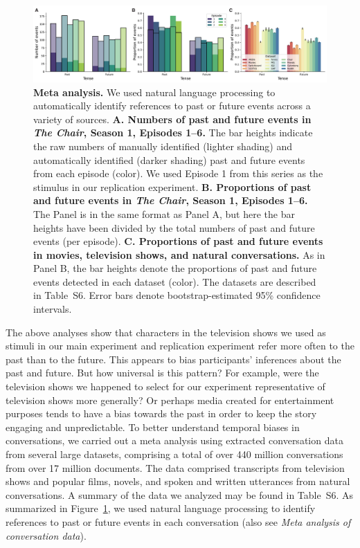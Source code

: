 \documentclass[10pt]{article}
\newcommand{\metaAnalysisDatasets}{S6}
\begin{document}
\begin{figure}[tp]
  \centering
  \includegraphics[width=\textwidth]{meta-analysis}

\caption{\textbf{Meta analysis.} We used natural language processing to
automatically identify references to past or future events across a variety of
sources. \textbf{A. Numbers of past and future events in \textit{The Chair},
Season 1, Episodes 1--6.} The bar heights indicate the raw numbers of manually
identified (lighter shading) and automatically identified (darker shading) past
and future events from each episode (color). We used Episode 1 from this series
as the stimulus in our replication experiment. \textbf{B. Proportions of past
and future events in \textit{The Chair}, Season 1, Episodes 1--6.} The Panel is
in the same format as Panel A, but here the bar heights have been divided by
the total numbers of past and future events (per episode). \textbf{C.
Proportions of past and future events in movies, television shows, and natural
conversations.} As in Panel B, the bar heights denote the proportions of past
and future events detected in each dataset (color). The datasets are described
in Table~\metaAnalysisDatasets. Error bars denote bootstrap-estimated 95\% confidence
intervals.}
  
  \label{fig:meta-analysis}
\end{figure}

The above analyses show that characters in the television shows we used as
stimuli in our main experiment and replication experiment refer more often to
the past than to the future. This appears to bias participants' inferences
about the past and future. But how universal is this pattern? For example, were
the television shows we happened to select for our experiment representative of
television shows more generally? Or perhaps media created for entertainment
purposes tends to have a bias towards the past in order to keep the story
engaging and unpredictable. To better understand temporal biases in
conversations, we carried out a meta analysis using extracted conversation data
from several large datasets, comprising a total of over 440 million
conversations from over 17 million documents. The data comprised transcripts
from television shows and popular films, novels, and spoken and written
utterances from natural conversations. A summary of the data we analyzed may be
found in Table~\metaAnalysisDatasets. As summarized in Figure~\ref{fig:meta-analysis}, we
used natural language processing to identify references to past or future
events in each conversation (also see \textit{Meta analysis of conversation
data}). 
\end{document}
